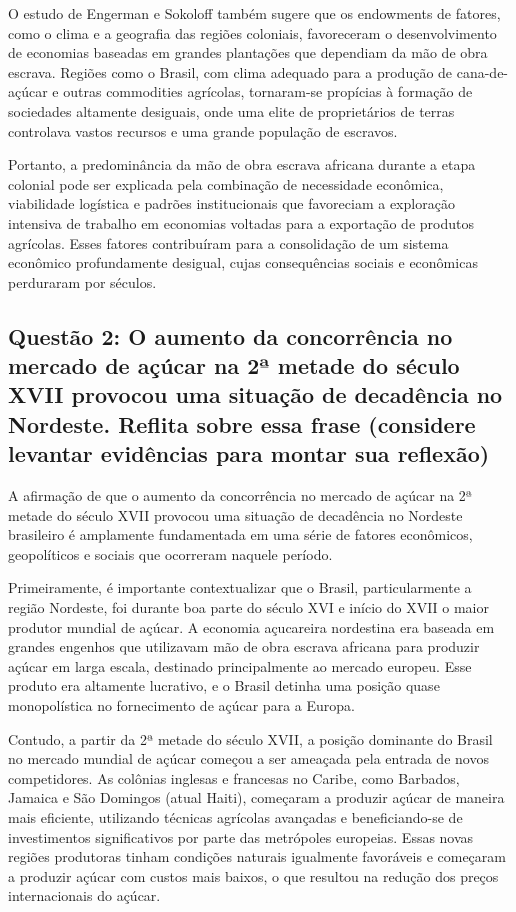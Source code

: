 \documentclass[a4paper,12pt]{article}[abntex2]
\begin{document}
O estudo de Engerman e Sokoloff também sugere que os endowments de fatores, como o clima e a geografia das regiões coloniais, favoreceram o desenvolvimento de economias baseadas em grandes plantações que dependiam da mão de obra escrava. Regiões como o Brasil, com clima adequado para a produção de cana-de-açúcar e outras commodities agrícolas, tornaram-se propícias à formação de sociedades altamente desiguais, onde uma elite de proprietários de terras controlava vastos recursos e uma grande população de escravos.

Portanto, a predominância da mão de obra escrava africana durante a etapa colonial pode ser explicada pela combinação de necessidade econômica, viabilidade logística e padrões institucionais que favoreciam a exploração intensiva de trabalho em economias voltadas para a exportação de produtos agrícolas. Esses fatores contribuíram para a consolidação de um sistema econômico profundamente desigual, cujas consequências sociais e econômicas perduraram por séculos.

\subsection{\textbf{Questão 2: O aumento da concorrência no mercado de açúcar na 2ª metade do século XVII provocou uma situação de decadência no Nordeste. Reflita sobre essa frase (considere levantar evidências para montar sua reflexão)}}

A afirmação de que o aumento da concorrência no mercado de açúcar na 2ª metade do século XVII provocou uma situação de decadência no Nordeste brasileiro é amplamente fundamentada em uma série de fatores econômicos, geopolíticos e sociais que ocorreram naquele período.

Primeiramente, é importante contextualizar que o Brasil, particularmente a região Nordeste, foi durante boa parte do século XVI e início do XVII o maior produtor mundial de açúcar. A economia açucareira nordestina era baseada em grandes engenhos que utilizavam mão de obra escrava africana para produzir açúcar em larga escala, destinado principalmente ao mercado europeu. Esse produto era altamente lucrativo, e o Brasil detinha uma posição quase monopolística no fornecimento de açúcar para a Europa.

Contudo, a partir da 2ª metade do século XVII, a posição dominante do Brasil no mercado mundial de açúcar começou a ser ameaçada pela entrada de novos competidores. As colônias inglesas e francesas no Caribe, como Barbados, Jamaica e São Domingos (atual Haiti), começaram a produzir açúcar de maneira mais eficiente, utilizando técnicas agrícolas avançadas e beneficiando-se de investimentos significativos por parte das metrópoles europeias. Essas novas regiões produtoras tinham condições naturais igualmente favoráveis e começaram a produzir açúcar com custos mais baixos, o que resultou na redução dos preços internacionais do açúcar.
\end{document}
